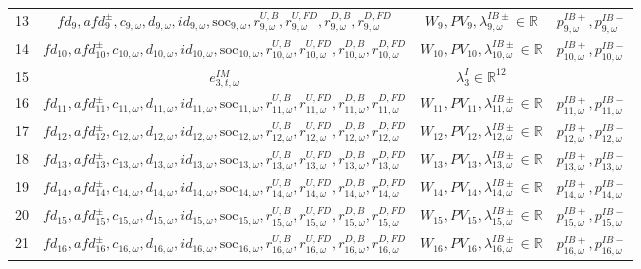 \documentclass{article}
\newcommand{\R}{\mathbb{R}}
\newcommand{\soc}{\text{soc}}
\begin{document}
\begin{table}
\begin{tabular}{c c c c}
	13 & $fd_9, afd^{\pm}_9, c_{9, \omega}, d_{9, \omega}, id_{9, \omega}, \soc_{9, \omega}, r^{U, B}_{9, \omega}, r^{U, FD}_{9, \omega}, r^{D, B}_{9, \omega}, r^{D, FD}_{9, \omega}$ & $W_9, PV_9, \lambda^{IB\pm}_{9, \omega} \in \R$ & $p^{IB+}_{9, \omega}, p^{IB-}_{9, \omega}$\\
	14 & $fd_{10}, afd^{\pm}_{10}, c_{10, \omega}, d_{10, \omega}, id_{10, \omega}, \soc_{10, \omega}, r^{U, B}_{10, \omega}, r^{U, FD}_{10, \omega}, r^{D, B}_{10, \omega}, r^{D, FD}_{10, \omega}$ & $W_{10}, PV_{10}, \lambda^{IB\pm}_{10, \omega} \in \R$ & $p^{IB+}_{10, \omega}, p^{IB-}_{10, \omega}$ \\
    15 & $e^{IM}_{3, t, \omega}$ & $\lambda^I_3 \in \R^{12}$ &  \\
	16 & $fd_{11}, afd^{\pm}_{11}, c_{11, \omega}, d_{11, \omega}, id_{11, \omega}, \soc_{11, \omega}, r^{U, B}_{11, \omega}, r^{U, FD}_{11, \omega}, r^{D, B}_{11, \omega}, r^{D, FD}_{11, \omega}$ & $W_{11}, PV_{11}, \lambda^{IB\pm}_{11, \omega} \in \R$ & $p^{IB+}_{11, \omega}, p^{IB-}_{11, \omega}$ \\
	17 & $fd_{12}, afd^{\pm}_{12}, c_{12, \omega}, d_{12, \omega}, id_{12, \omega}, \soc_{12, \omega}, r^{U, B}_{12, \omega}, r^{U, FD}_{12, \omega}, r^{D, B}_{12, \omega}, r^{D, FD}_{12, \omega}$ & $W_{12}, PV_{12}, \lambda^{IB\pm}_{12, \omega} \in \R$ & $p^{IB+}_{12, \omega}, p^{IB-}_{12, \omega}$ \\
	18 & $fd_{13}, afd^{\pm}_{13}, c_{13, \omega}, d_{13, \omega}, id_{13, \omega}, \soc_{13, \omega}, r^{U, B}_{13, \omega}, r^{U, FD}_{13, \omega}, r^{D, B}_{13, \omega}, r^{D, FD}_{13, \omega}$ & $W_{13}, PV_{13}, \lambda^{IB\pm}_{13, \omega} \in \R$ & $p^{IB+}_{13, \omega}, p^{IB-}_{13, \omega}$ \\
	19 & $fd_{14}, afd^{\pm}_{14}, c_{14, \omega}, d_{14, \omega}, id_{14, \omega}, \soc_{14, \omega}, r^{U, B}_{14, \omega}, r^{U, FD}_{14, \omega}, r^{D, B}_{14, \omega}, r^{D, FD}_{14, \omega}$ & $W_{14}, PV_{14}, \lambda^{IB\pm}_{14, \omega} \in \R$ & $p^{IB+}_{14, \omega}, p^{IB-}_{14, \omega}$ \\
	20 & $fd_{15}, afd^{\pm}_{15}, c_{15, \omega}, d_{15, \omega}, id_{15, \omega}, \soc_{15, \omega}, r^{U, B}_{15, \omega}, r^{U, FD}_{15, \omega}, r^{D, B}_{15, \omega}, r^{D, FD}_{15, \omega}$ & $W_{15}, PV_{15}, \lambda^{IB\pm}_{15, \omega} \in \R$ & $p^{IB+}_{15, \omega}, p^{IB-}_{15, \omega}$ \\
	21 & $fd_{16}, afd^{\pm}_{16}, c_{16, \omega}, d_{16, \omega}, id_{16, \omega}, \soc_{16, \omega}, r^{U, B}_{16, \omega}, r^{U, FD}_{16, \omega}, r^{D, B}_{16, \omega}, r^{D, FD}_{16, \omega}$ & $W_{16}, PV_{16}, \lambda^{IB\pm}_{16, \omega} \in \R$ & $p^{IB+}_{16, \omega}, p^{IB-}_{16, \omega}$ \\

\end{tabular}
\end{table}
\end{document}
